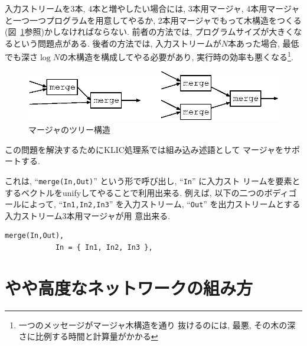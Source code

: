 \documentclass[a4,titlepage]{jsreport}
\newenvironment{program}{\begin{quote}}{\end{quote}}
\begin{document}
入力ストリームを3本, 4本と増やしたい場合には, 
3本用マージャ, 4本用マージャと一つ一つプログラムを用意してやるか, 
2本用マージャでもって木構造をつくる
(図~\ref{merge}参照)かしなければならない.  
前者の方法では, プログラムサイズが大きくなるという問題点がある.  
後者の方法では, 入力ストリームが$N$本あった場合, 
最低でも深さ$\log N$の木構造を構成してやる必要があり, 
実行時の効率も悪くなる\footnote{一つのメッセージがマージャ木構造を通り
抜けるのには, 最悪, その木の深さに比例する時間と計算量がかかる}.  

\begin{figure}
\begin{center}
\includegraphics{fig/merge.eps}
\caption{マージャのツリー構造}
\label{merge}
\end{center}
\end{figure}

この問題を解決するためにKLIC処理系では組み込み述語として
マージャをサポートする.  

これは, ``\verb!merge(In,Out)!'' という形で呼び出し, ``\verb!In!'' に入力スト
リームを要素とするベクトルをunifyしてやることで利用出来る.  例えば, 
以下の二つのボディゴールによって,  ``\verb!In1,In2,In3!'' を入力ストリーム, 
 ``\verb!Out!'' を出力ストリームとする入力ストリーム3本用マージャが用
意出来る.   

\begin{Verbatim}[baselinestretch=0.8]
            merge(In,Out),
            In = { In1, In2, In3 },
\end{Verbatim}


\section{やや高度なネットワークの組み方}
\end{document}
